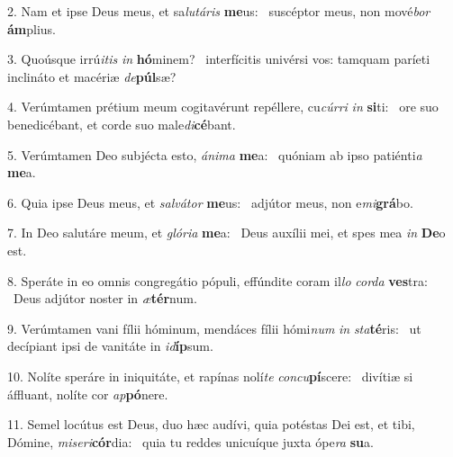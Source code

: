 2. Nam et ipse Deus meus, et sa\textit{lu}\textit{tá}\textit{ris} \textbf{me}us: \ast\  suscéptor meus, non mové\textit{bor} \textbf{ám}plius.\

3. Quoúsque irrú\textit{i}\textit{tis} \textit{in} \textbf{hó}minem? \ast\  interfícitis univérsi vos: tamquam paríeti inclináto et macériæ \textit{de}\textbf{púl}sæ?\

4. Verúmtamen prétium meum cogitavérunt repéllere, cu\textit{cúr}\textit{ri} \textit{in} \textbf{si}ti: \ast\  ore suo benedicébant, et corde suo male\textit{di}\textbf{cé}bant.\

5. Verúmtamen Deo subjécta esto, \textit{á}\textit{ni}\textit{ma} \textbf{me}a: \ast\  quóniam ab ipso patiénti\textit{a} \textbf{me}a.\

6. Quia ipse Deus meus, et \textit{sal}\textit{vá}\textit{tor} \textbf{me}us: \ast\  adjútor meus, non e\textit{mi}\textbf{grá}bo.\

7. In Deo salutáre meum, et \textit{gló}\textit{ri}\textit{a} \textbf{me}a: \ast\  Deus auxílii mei, et spes mea \textit{in} \textbf{De}o est.\

8. Speráte in eo omnis congregátio pópuli, effúndite coram il\textit{lo} \textit{cor}\textit{da} \textbf{ves}tra: \ast\  Deus adjútor noster in \textit{æ}\textbf{tér}num.\

9. Verúmtamen vani fílii hóminum, mendáces fílii hómi\textit{num} \textit{in} \textit{sta}\textbf{té}ris: \ast\  ut decípiant ipsi de vanitáte in \textit{id}\textbf{íp}sum.\

10. Nolíte speráre in iniquitáte, et rapínas nolí\textit{te} \textit{con}\textit{cu}\textbf{pí}scere: \ast\  divítiæ si áffluant, nolíte cor \textit{ap}\textbf{pó}nere.\

11. Semel locútus est Deus, duo hæc audívi, quia potéstas Dei est, et tibi, Dómine, \textit{mi}\textit{se}\textit{ri}\textbf{cór}dia: \ast\  quia tu reddes unicuíque juxta ópe\textit{ra} \textbf{su}a.\

